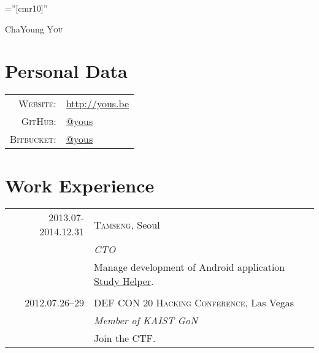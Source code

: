 \documentclass[a4paper,10pt]{article}
\begin{document}

\pagestyle{empty} %

\font\fb=''[cmr10]'' %

\par{\centering
{\Huge ChaYoung \textsc{You}
}\bigskip\par}

\section{Personal Data}

\begin{tabular}{rl}
  \textsc{Website:}   & \url{http://yous.be} \\
  \textsc{GitHub:}    & \href{https://github.com/yous}{@yous} \\
  \textsc{Bitbucket:} & \href{https://bitbucket.org/yous}{@yous}
\end{tabular}

\section{Work Experience}
\begin{tabular}{r|p{11cm}}
  \textsc{2013.07-2014.12.31} & \textsc{Tamseng}, Seoul \\
  & \emph{CTO} \\
  & Manage development of Android application \href{https://play.google.com/store/apps/details?id=kr.co.tamseng.StudyHelper}{Study Helper}. \\
  \multicolumn{2}{c}{} \\

  \textsc{2012.07.26--29} & \textsc{DEF CON 20 Hacking Conference}, Las Vegas \\
  & \emph{Member of KAIST GoN} \\
  & Join the CTF.
\end{tabular}
\end{document}
